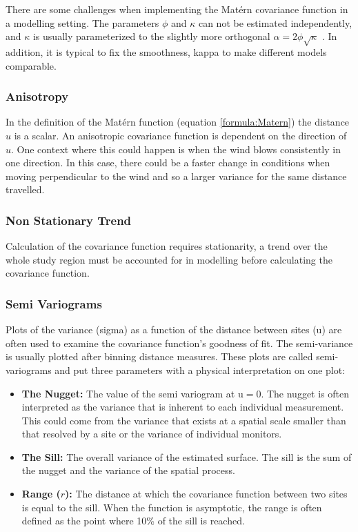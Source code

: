 \documentclass{article}
\begin{document}
	There are some challenges when implementing the Mat\'{e}rn covariance function in a modelling setting.  The parameters $\phi$ and $\kappa$ can not be estimated independently, and $\kappa$ is usually parameterized to the slightly more orthogonal $\alpha = 2\phi \sqrt{\kappa}$  \citep{diggle:07}.  In addition, it is typical to fix the smoothness, \gls{kappa} to make different models comparable. 
	
	\subsubsection*{Anisotropy}
	\label{subsubsec:anisotropy}
	In the definition of the Mat\'{e}rn function (equation \ref{formula:Matern}) the distance $u$ is a scalar.  An anisotropic covariance function is dependent on the direction of $u$.  One context where this could happen is when the wind blows consistently in one direction.  In this case, there could be a faster change in conditions when moving perpendicular to the wind and so a larger variance for the same distance travelled.  
	
	\subsubsection*{Non Stationary Trend}\label{subsubsec:nonstatiomary}
	Calculation of the covariance function requires stationarity, a trend over the whole study region must be accounted for in modelling before calculating the covariance function.
	
	\subsubsection*{Semi Variograms}
	\label{subsubsec:semivariograms}
	Plots of the variance (\gls{sigma}) as a function of the distance between sites (\gls{u}) are often used to examine the covariance function's goodness of fit. The semi-variance is usually plotted after binning distance measures. These plots are called semi-variograms and put three parameters with a physical interpretation on one plot:
	
	\begin{itemize}
		\item \textbf{The Nugget:} The value of the semi variogram at \gls{u}$=0$.  The nugget is often interpreted as the variance that is inherent to each individual measurement.  This could come from the variance that exists at a spatial scale smaller than that resolved by a site or the variance of individual monitors.
		\item  \textbf{The Sill:} The overall variance of the estimated surface.  The sill is the sum of the nugget and the variance of the spatial process.
		\item \textbf{Range ($r$):} The distance at which the covariance function between two sites is equal to the sill.  When the function is asymptotic, the range is often defined as the point where 10\% of the sill is reached.  
	\end{itemize}
	
\end{document}
